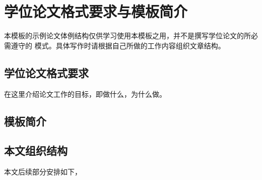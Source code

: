 
\chapter{学位论文格式要求与\XeLaTeX{}模板简介}
\label{cha:intro}

本模板的示例论文体例结构仅供学习使用本模板之用，并不是撰写学位论文的所必需遵守的
模式。具体写作时请根据自己所做的工作内容组织文章结构。

\section{学位论文格式要求}
\label{sec:motivation}

在这里介绍论文工作的目标，即做什么，为什么做。

\section{\XeLaTeX{}模板简介}
\label{sec:related-works}

\section{本文组织结构}
\label{sec:organization}

本文后续部分安排如下，


